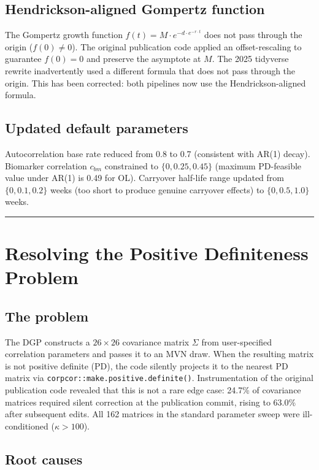 \documentclass[11pt]{article}
\begin{document}
\subsection{Hendrickson-aligned Gompertz function}

The Gompertz growth function $f(t) = M \cdot e^{-d \cdot
e^{-r \cdot t}}$ does not pass through the origin ($f(0) \neq 0$).
The original publication code applied an offset-rescaling to
guarantee $f(0) = 0$ and preserve the asymptote at $M$. The 2025
tidyverse rewrite inadvertently used a different formula that does
not pass through the origin. This has been corrected: both
pipelines now use the Hendrickson-aligned formula.

\subsection{Updated default parameters}

Autocorrelation base rate reduced from 0.8 to 0.7 (consistent
with AR(1) decay). Biomarker correlation $c_{bm}$ constrained to
$\{0, 0.25, 0.45\}$ (maximum PD-feasible value under AR(1) is
0.49 for OL). Carryover half-life range updated from $\{0, 0.1,
0.2\}$ weeks (too short to produce genuine carryover effects) to
$\{0, 0.5, 1.0\}$ weeks.

\bigskip\noindent\rule{\textwidth}{0.4pt}\bigskip

\section{Resolving the Positive Definiteness Problem}

\subsection{The problem}

The DGP constructs a $26 \times 26$ covariance matrix $\Sigma$
from user-specified correlation parameters and passes it to an
MVN draw. When the resulting matrix is not positive definite (PD),
the code silently projects it to the nearest PD matrix via
\texttt{corpcor::make.positive.definite()}. Instrumentation of the
original publication code revealed that this is not a rare edge
case: 24.7\% of covariance matrices required silent correction at
the publication commit, rising to 63.0\% after subsequent edits.
All 162 matrices in the standard parameter sweep were
ill-conditioned ($\kappa > 100$).

\subsection{Root causes}
\end{document}
